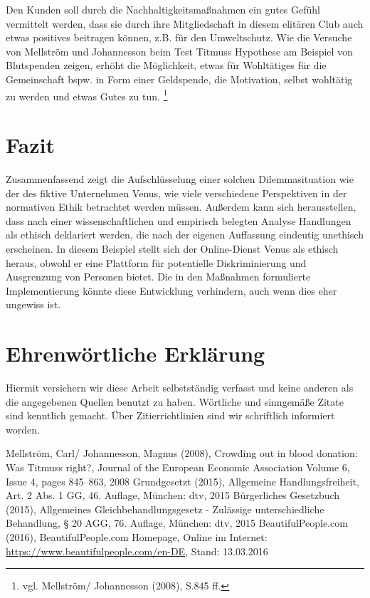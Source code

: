 \documentclass[a4paper, fontsize=12pt, parskip=full, toc=bibliographynumbered]{scrreprt}
\begin{document}
Den Kunden soll durch die Nachhaltigkeitsmaßnahmen ein gutes Gefühl vermittelt werden, dass sie durch ihre Mitgliedschaft in diesem elitären Club auch etwas positives beitragen können, z.B. für den Umweltschutz. Wie die Versuche von Mellström und Johannesson beim Test Titmuss Hypothese am Beispiel von Blutspenden zeigen, erhöht die Möglichkeit, etwas für Wohltätiges für die Gemeinschaft bspw. in Form einer Geldspende, die Motivation, selbst wohltätig zu werden und etwas Gutes zu tun. \footnote{vgl. Mellström/ Johannesson (2008), S.845 ff.} 

\chapter{Fazit}

Zusammenfassend zeigt die Aufschlüsselung einer solchen Dilemmasituation wie der des fiktive Unternehmen Venus, wie viele verschiedene Perspektiven in der normativen Ethik betrachtet werden müssen. Außerdem kann sich herausstellen, dass nach einer wissenschaftlichen und empirisch belegten Analyse Handlungen als ethisch deklariert werden, die nach der eigenen Auffassung eindeutig unethisch erscheinen. In diesem Beispiel stellt sich der Online-Dienst Venus als ethisch heraus, obwohl er eine Plattform für potentielle Diskriminierung und Ausgrenzung von Personen bietet. Die in den Maßnahmen formulierte Implementierung könnte diese Entwicklung verhindern, auch wenn dies eher ungewiss ist. 

\chapter{Ehrenwörtliche Erklärung}

Hiermit versichern wir diese Arbeit selbstständig verfasst und keine
anderen als die angegebenen Quellen benutzt zu haben.  Wörtliche und
sinngemäße Zitate sind kenntlich gemacht.  Über Zitierrichtlinien
sind wir schriftlich informiert worden.

\renewcommand{\bibname}{Quellenverzeichnis}
\begin{thebibliography}{9}
 Mellström, Carl/ Johannesson, Magnus (2008), Crowding out in blood donation: Was Titmuss right?, Journal of the European Economic Association Volume 6, Issue 4, pages 845–863, 2008
 Grundgesetzt (2015), Allgemeine Handlungsfreiheit, Art. 2 Abs. 1 GG, 46. Auflage, München: dtv, 2015
 Bürgerliches Gesetzbuch (2015), Allgemeines Gleichbehandlungsgesetz - Zulässige unterschiedliche Behandlung, § 20 AGG, 76. Auflage, München: dtv,  2015
 BeautifulPeople.com (2016), BeautifulPeople.com Homepage, Online im Internet: \url{https://www.beautifulpeople.com/en-DE}, Stand: 13.03.2016
\end{thebibliography}
\end{document}
